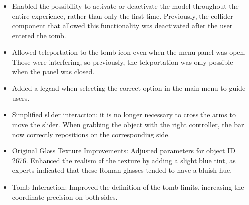 \begin{itemize}
 \item Enabled the possibility to activate or deactivate the model throughout the entire experience, rather than only the first time. Previously, the collider component that allowed this functionality was deactivated after the user entered the tomb.
 \item Allowed teleportation to the tomb icon even when the menu panel was open. Those were interfering, so previously, the teleportation was only possible when the panel was closed.
 \item Added a legend when selecting the correct option in the main menu to guide users.
 \item Simplified slider interaction: it is no longer necessary to cross the arms to move the slider. When grabbing the object with the right controller, the bar now correctly repositions on the corresponding side.
 \item Original Glass Texture Improvements: Adjusted parameters for object \gls{ID} 2676. Enhanced the realism of the texture by adding a slight blue tint, as experts indicated that these Roman glasses tended to have a bluish hue.
 \item Tomb Interaction: Improved the definition of the tomb limits, increasing the coordinate precision on both sides.
\end{itemize}

